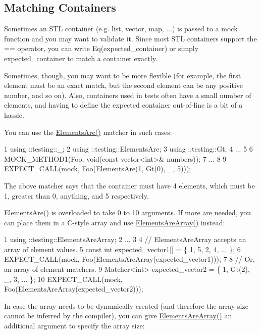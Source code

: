 \subsection*{Matching Containers}

Sometimes an S\+TL container (e.\+g. list, vector, map, ...) is passed to a mock function and you may want to validate it. Since most S\+TL containers support the {\ttfamily ==} operator, you can write {\ttfamily Eq(expected\+\_\+container)} or simply {\ttfamily expected\+\_\+container} to match a container exactly.

Sometimes, though, you may want to be more flexible (for example, the first element must be an exact match, but the second element can be any positive number, and so on). Also, containers used in tests often have a small number of elements, and having to define the expected container out-\/of-\/line is a bit of a hassle.

You can use the {\ttfamily \hyperlink{namespacetesting_a79cf4ae694bf8231dcf283b325405f27}{Elements\+Are()}} matcher in such cases\+:


\begin{DoxyCode}
1 using ::testing::\_;
2 using ::testing::ElementsAre;
3 using ::testing::Gt;
4 ...
5 
6   MOCK\_METHOD1(Foo, void(const vector<int>& numbers));
7 ...
8 
9   EXPECT\_CALL(mock, Foo(ElementsAre(1, Gt(0), \_, 5)));
\end{DoxyCode}


The above matcher says that the container must have 4 elements, which must be 1, greater than 0, anything, and 5 respectively.

{\ttfamily \hyperlink{namespacetesting_a79cf4ae694bf8231dcf283b325405f27}{Elements\+Are()}} is overloaded to take 0 to 10 arguments. If more are needed, you can place them in a C-\/style array and use {\ttfamily \hyperlink{namespacetesting_ae2eee06e7ddbf5f5372fd24372e9703f}{Elements\+Are\+Array()}} instead\+:


\begin{DoxyCode}
1 using ::testing::ElementsAreArray;
2 ...
3 
4   // ElementsAreArray accepts an array of element values.
5   const int expected\_vector1[] = \{ 1, 5, 2, 4, ... \};
6   EXPECT\_CALL(mock, Foo(ElementsAreArray(expected\_vector1)));
7 
8   // Or, an array of element matchers.
9   Matcher<int> expected\_vector2 = \{ 1, Gt(2), \_, 3, ... \};
10   EXPECT\_CALL(mock, Foo(ElementsAreArray(expected\_vector2)));
\end{DoxyCode}


In case the array needs to be dynamically created (and therefore the array size cannot be inferred by the compiler), you can give {\ttfamily \hyperlink{namespacetesting_ae2eee06e7ddbf5f5372fd24372e9703f}{Elements\+Are\+Array()}} an additional argument to specify the array size\+:


